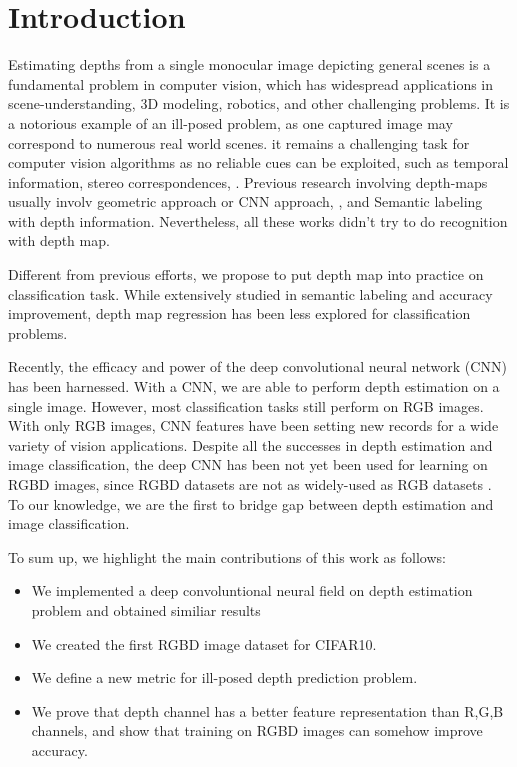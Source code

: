 \documentclass[10pt,twocolumn,letterpaper]{article}
\begin{document}
\section{Introduction}
Estimating depths from a single monocular image depicting 
general scenes is a fundamental problem in computer vision, 
which has widespread applications in scene-understanding, 
3D modeling, robotics, and other challenging problems.
It is a notorious example of an ill-posed problem, 
as one captured image may correspond to numerous real world scenes\cite{eigen2014depth}. 
it remains a challenging task for computer vision algorithms as no reliable cues can be exploited,
such as temporal information, stereo correspondences, \etc.
Previous research involving depth-maps usually involv
geometric\cite{hedau2010thinking,gupta2010estimating,gupta2010blocks} 
approach or CNN\cite{liu2015deep} approach,
, and Semantic labeling\cite{ladicky2014pulling} with depth information.
Nevertheless, all these works didn't try to do recognition with depth map.

Different from previous efforts, 
we propose to put depth map into practice on classification task.
While extensively studied in semantic labeling and accuracy improvement,
depth map regression has been less explored for classification problems.

Recently, the efficacy and power of the deep
convolutional neural network (CNN) has been harnessed. 
With a CNN, we are able to perform depth estimation on a single image\cite{liu2015deep}.
However, most classification tasks still perform on RGB images.
With only RGB images, CNN features have been setting new records for a wide variety of vision applications\cite{razavian2014cnn}.
Despite all the successes in depth estimation and image classification,
the deep CNN has been not yet been used for learning on RGBD images, since RGBD datasets are not as widely-used as RGB datasets .
To our knowledge, we are the first to bridge gap between depth estimation and image classification.

To sum up, we highlight the main contributions of this work as follows:
\begin{itemize}
\vspace{-.12cm} \item 
We implemented a deep convoluntional neural field on depth estimation problem and obtained similiar results
\vspace{-.12cm} \item
We created the first RGBD image dataset for CIFAR10.
\vspace{-.12cm} \item 
We define a new metric for ill-posed depth prediction problem.
\vspace{-.12cm} \item 
We prove that depth channel has a better feature representation than R,G,B channels,
and show that training on RGBD images can somehow improve accuracy.
\end{itemize}
\end{document}
